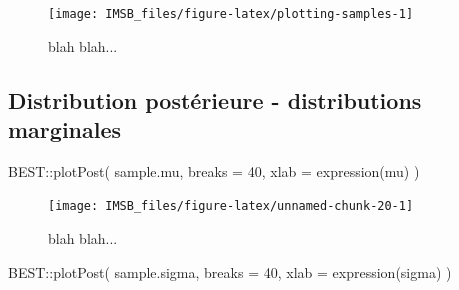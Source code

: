 \documentclass[
  a4paper,11pt,twoside,onecolumn,openright,final,oldfontcommands]{memoir}
\newenvironment{Shaded}{\begin{snugshade}}{\end{snugshade}}
\newcommand{\AttributeTok}[1]{\textcolor[rgb]{0.77,0.63,0.00}{#1}}
\newcommand{\ConstantTok}[1]{\textcolor[rgb]{0.00,0.00,0.00}{#1}}
\newcommand{\DecValTok}[1]{\textcolor[rgb]{0.00,0.00,0.81}{#1}}
\newcommand{\FloatTok}[1]{\textcolor[rgb]{0.00,0.00,0.81}{#1}}
\newcommand{\FunctionTok}[1]{\textcolor[rgb]{0.00,0.00,0.00}{#1}}
\newcommand{\NormalTok}[1]{#1}
\newcommand{\OtherTok}[1]{\textcolor[rgb]{0.56,0.35,0.01}{#1}}
\newcommand{\SpecialCharTok}[1]{\textcolor[rgb]{0.00,0.00,0.00}{#1}}
\theoremstyle{definition}
\theoremstyle{definition}
\theoremstyle{definition}
\theoremstyle{definition}
\theoremstyle{remark}
\begin{document}
\begin{Shaded}
\end{Shaded}

\begin{figure}[!htb]

{\centering \texttt{[image: IMSB\_files/figure-latex/plotting-samples-1]} 

}

\caption{blah blah...}\label{fig:plotting-samples}
\end{figure}

\hypertarget{distribution-postuxe9rieure---distributions-marginales}{%
\subsection{Distribution postérieure - distributions marginales}\label{distribution-postuxe9rieure---distributions-marginales}}

\begin{Shaded}
\begin{Highlighting}[]
\NormalTok{BEST}\SpecialCharTok{::}\FunctionTok{plotPost}\NormalTok{(}
\NormalTok{  sample.mu, }\AttributeTok{breaks =} \DecValTok{40}\NormalTok{, }\AttributeTok{xlab =} \FunctionTok{expression}\NormalTok{(mu)}
\NormalTok{  )}
\end{Highlighting}
\end{Shaded}

\begin{figure}[!htb]

{\centering \texttt{[image: IMSB\_files/figure-latex/unnamed-chunk-20-1]} 

}

\caption{blah blah...}\label{fig:unnamed-chunk-20}
\end{figure}

\begin{Shaded}
\begin{Highlighting}[]
\NormalTok{BEST}\SpecialCharTok{::}\FunctionTok{plotPost}\NormalTok{(}
\NormalTok{  sample.sigma, }\AttributeTok{breaks =} \DecValTok{40}\NormalTok{, }\AttributeTok{xlab =} \FunctionTok{expression}\NormalTok{(sigma)}
\NormalTok{  )}
\end{Highlighting}
\end{Shaded}
\end{document}
